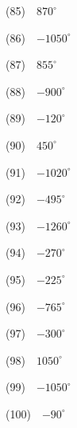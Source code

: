 \documentclass[a4j,twocolumn,10pt,fleqn,dvipdfmx]{jarticle}
\begin{document}
(85)~~$870^\circ$

(86)~~$-1050^\circ$

(87)~~$855^\circ$

(88)~~$-900^\circ$

(89)~~$-120^\circ$

(90)~~$450^\circ$

(91)~~$-1020^\circ$

(92)~~$-495^\circ$

(93)~~$-1260^\circ$

(94)~~$-270^\circ$

(95)~~$-225^\circ$

(96)~~$-765^\circ$

(97)~~$-300^\circ$

(98)~~$1050^\circ$

(99)~~$-1050^\circ$

(100)~~$-90^\circ$
\end{document}
